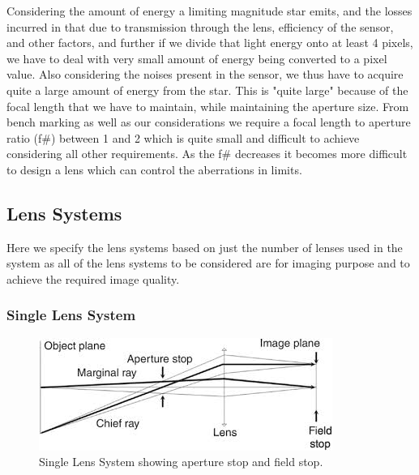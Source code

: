 \documentclass[../../main.tex]{subfiles}
\begin{document}
\begin{itemize}
Considering the amount of energy a limiting magnitude star emits, and the losses incurred in that due to transmission through the lens, efficiency of the sensor, and other factors, and further if we divide that light energy onto at least 4 pixels, we have to deal with very small amount of energy being converted to a pixel value. Also considering the noises present in the sensor, we thus have to acquire quite a large amount of energy from the star.
This is "quite large" because of the focal length that we have to maintain, while maintaining the aperture size. From bench marking as well as our considerations we require a focal length to aperture ratio (f\#) between 1 and 2 which is quite small and difficult to achieve considering all other requirements. As the f\# decreases it becomes more difficult to design a lens which can control the aberrations in limits.
\end{itemize}

\subsection{Lens Systems}
Here we specify the lens systems based on just the number of lenses used in the system as all of the lens systems to be considered are for imaging purpose and to achieve the required image quality.
\subsubsection{Single Lens System}
\graphicspath{}
\begin{figure}[h!]
    \centering
    \includegraphics{Figures/Instrumentation/single_lens_system.jpg}
    \caption{Single Lens System showing aperture stop and field stop.}
    \label{fig:8.1}
\end{figure}
\end{document}
